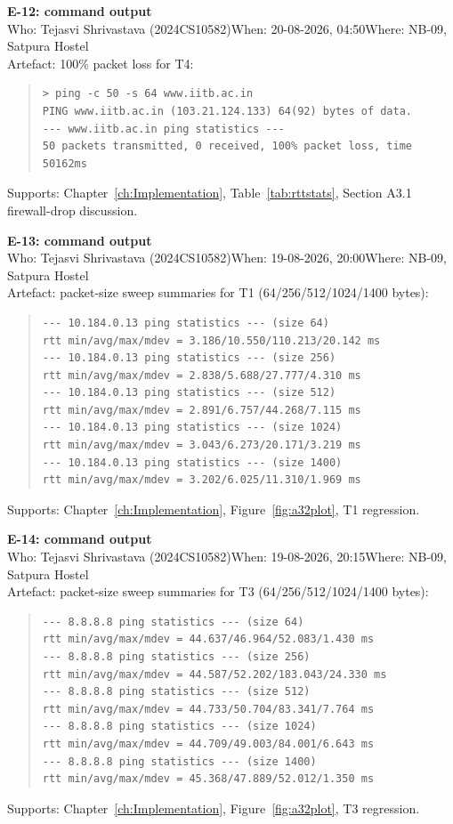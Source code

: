 \textbf{E-12: command output}\\
Who: Tejasvi Shrivastava (2024CS10582)\quad When: 20-08-2026, 04:50\quad Where: NB-09, Satpura Hostel\\
Artefact: 100\% packet loss for T4:
\begin{quote}\ttfamily\footnotesize
\begin{verbatim}
> ping -c 50 -s 64 www.iitb.ac.in
PING www.iitb.ac.in (103.21.124.133) 64(92) bytes of data.
--- www.iitb.ac.in ping statistics ---
50 packets transmitted, 0 received, 100% packet loss, time 50162ms
\end{verbatim}
\end{quote}
Supports: Chapter~\ref{ch:Implementation}, Table~\ref{tab:rttstats}, Section A3.1 firewall-drop discussion.

\textbf{E-13: command output}\\
Who: Tejasvi Shrivastava (2024CS10582)\quad When: 19-08-2026, 20:00\quad Where: NB-09, Satpura Hostel\\
Artefact: packet-size sweep summaries for T1 (64/256/512/1024/1400 bytes):
\begin{quote}\ttfamily\footnotesize
\begin{verbatim}
--- 10.184.0.13 ping statistics --- (size 64)
rtt min/avg/max/mdev = 3.186/10.550/110.213/20.142 ms
--- 10.184.0.13 ping statistics --- (size 256)
rtt min/avg/max/mdev = 2.838/5.688/27.777/4.310 ms
--- 10.184.0.13 ping statistics --- (size 512)
rtt min/avg/max/mdev = 2.891/6.757/44.268/7.115 ms
--- 10.184.0.13 ping statistics --- (size 1024)
rtt min/avg/max/mdev = 3.043/6.273/20.171/3.219 ms
--- 10.184.0.13 ping statistics --- (size 1400)
rtt min/avg/max/mdev = 3.202/6.025/11.310/1.969 ms
\end{verbatim}
\end{quote}
Supports: Chapter~\ref{ch:Implementation}, Figure~\ref{fig:a32plot}, T1 regression.

\textbf{E-14: command output}\\
Who: Tejasvi Shrivastava (2024CS10582)\quad When: 19-08-2026, 20:15\quad Where: NB-09, Satpura Hostel\\
Artefact: packet-size sweep summaries for T3 (64/256/512/1024/1400 bytes):
\begin{quote}\ttfamily\footnotesize
\begin{verbatim}
--- 8.8.8.8 ping statistics --- (size 64)
rtt min/avg/max/mdev = 44.637/46.964/52.083/1.430 ms
--- 8.8.8.8 ping statistics --- (size 256)
rtt min/avg/max/mdev = 44.587/52.202/183.043/24.330 ms
--- 8.8.8.8 ping statistics --- (size 512)
rtt min/avg/max/mdev = 44.733/50.704/83.341/7.764 ms
--- 8.8.8.8 ping statistics --- (size 1024)
rtt min/avg/max/mdev = 44.709/49.003/84.001/6.643 ms
--- 8.8.8.8 ping statistics --- (size 1400)
rtt min/avg/max/mdev = 45.368/47.889/52.012/1.350 ms
\end{verbatim}
\end{quote}
Supports: Chapter~\ref{ch:Implementation}, Figure~\ref{fig:a32plot}, T3 regression.

